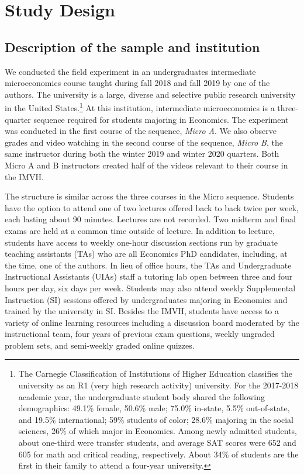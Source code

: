 \documentclass[12pt]{article}
\begin{document}

\section{Study Design} \label{studydesign}

\subsection{Description of the sample and institution}

We conducted the field experiment in an undergraduates intermediate microeconomics course taught during fall 2018 and fall 2019 by one of the authors. The university is a large, diverse and selective public research university in the United States.\footnote{The Carnegie Classification of Institutions of Higher Education classifies the university as an R1 (very high research activity) university. For the 2017-2018 academic year, the undergraduate student body shared the following demographics: 49.1\% female, 50.6\% male; 75.0\% in-state, 5.5\% out-of-state, and 19.5\% international; 59\% students of color; 28.6\% majoring in the social sciences, 26\% of which major in Economics. Among newly admitted students, about one-third were transfer students, and average SAT scores were 652 and 605 for math and critical reading, respectively. About 34\% of students are the first in their family to attend a four-year university.} At this institution, intermediate microeconomics is a three-quarter sequence required for students majoring in Economics. The experiment was conducted in the first course of the sequence, \textit{Micro A}. We also observe grades and video watching in the second course of the sequence, \textit{Micro B}, the same instructor during both the winter 2019 and winter 2020 quarters. Both Micro A and B instructors created half of the videos relevant to their course in the IMVH.


The structure is similar across the three courses in the Micro sequence. Students have the option to attend one of two lectures offered back to back twice per week, each lasting about 90 minutes. Lectures are not recorded. Two midterm and final exams are held at a common time outside of lecture. In addition to lecture, students have access to weekly one-hour discussion sections run by graduate teaching assistants (TAs) who are all Economics PhD candidates, including, at the time, one of the authors. In lieu of office hours, the TAs and Undergraduate Instructional Assistants (UIAs) staff a tutoring lab open between three and four hours per day, six days per week. Students may also attend weekly Supplemental Instruction (SI) sessions offered by undergraduates majoring in Economics and trained by the university in SI. Besides the IMVH, students have access to a variety of online learning resources including a discussion board moderated by the instructional team, four years of previous exam questions, weekly ungraded problem sets, and semi-weekly graded online quizzes.
\end{document}

